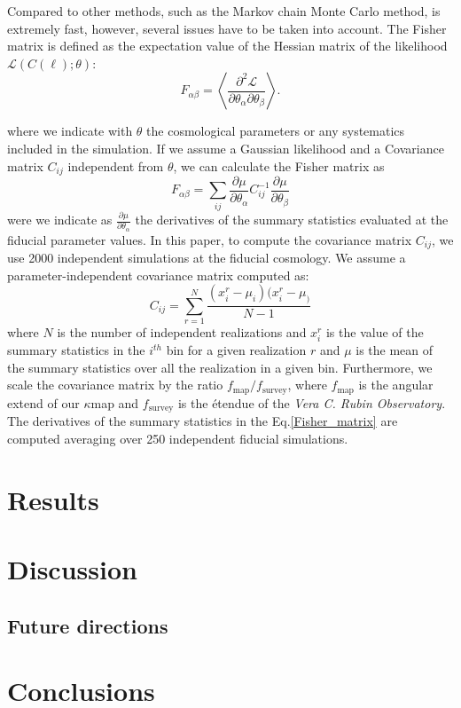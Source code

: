 \documentclass[twocolumn,twocolappendix]{aastex63}
\begin{document}
Compared to other methods, such as the Markov chain Monte Carlo method, is extremely fast, however, several issues have to be taken into account. 
The Fisher matrix is defined as the expectation value of the Hessian matrix of the likelihood $\mathcal{L}(C(\ell);\theta)$:
\begin{equation}
    F_{\alpha \beta}=\left \langle 
    \frac{\partial^2\mathcal{L}}
    {\partial \theta_{\alpha}\partial \theta_{\beta}}
    \right \rangle .
\end{equation}

where we indicate with $\theta$ the cosmological parameters or any systematics included in the simulation.
If we assume a Gaussian likelihood and a Covariance matrix $C_{ij}$ independent from $\theta$, we can calculate the Fisher matrix as
\begin{equation}\label{Fisher_matrix}
      F_{\alpha \beta}= \sum_{ij}\frac{\partial \mu}{\partial \theta_{\alpha}} C_{ij}^{-1}
      \frac{\partial \mu}{\partial \theta_{\beta}}
\end{equation}
were we indicate as $ \frac{\partial \mu}{\partial \theta_{\alpha}} $ the derivatives of the summary statistics evaluated at the fiducial parameter values.
In this paper, to compute the covariance matrix $C_{ij}$, we use 2000 independent simulations at the fiducial cosmology. 
We assume a parameter-independent covariance matrix computed as:
\begin{equation}
    C_{ij}=\sum_{r=1}^N
    \frac{(x_i^r-\mu_i)(x_i^r-\mu_)}{N-1}
\end{equation}
where $N$ is the number of independent realizations and $x_i^r$ is the value of the summary statistics in the $i^{th}$ bin for a given realization $r$ and $\mu$ is the mean of the summary statistics over all the realization in a given bin. 
Furthermore, we scale the covariance matrix by the ratio $f_{\text{map}}/f_{\text{survey}}$, where $f_{\text{map}}$ is the angular extend of our $\kappa$map and $f_{\text{survey}}$ is the étendue of the \textit{Vera C. Rubin Observatory}.
The derivatives of the summary statistics in the Eq.\ref{Fisher_matrix} are computed averaging over 250 independent fiducial simulations.


\section{Results}

\section{Discussion}

\subsection{Future directions}

\section{Conclusions}






\end{document}
